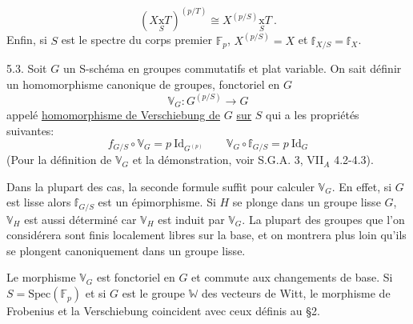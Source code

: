 \[ (X \underset{S}{\text{x}} T)^{(p/T)} \cong X^{(p/S)} \underset{S}{\text{x}} T \ . \]
Enfin, si $S$ est le spectre du corps premier $\mathbb{F}_p$, $X^{(p/S)} = X$ et
$\mathbb{f}_{X/S} = \mathbb{f}_X$.

5.3. Soit $G$ un S-schéma en groupes commutatifs et plat variable.
On sait définir un homomorphisme canonique de groupes, fonctoriel en $G$
\[ \mathbb{V}_G \colon G^{(p/S)} \to G \]
appelé \uline{homomorphisme de Verschiebung de} $G$ \uline{sur} $S$ qui a les propriétés
suivantes:
\[ \boxed{ f_{G/S} \circ \mathbb{V}_G = p \ \mathrm{Id}_{G^{(p)}} \qquad \mathbb{V}_G \circ \mathbb{f}_{G/S} = p \ \mathrm{Id}_G } \]
(Pour la définition de $\mathbb{V}_G$ et la démonstration, voir S.G.A. 3, VII$_A$
4.2-4.3).

Dans la plupart des cas, la seconde formule suffit pour calculer
$\mathbb{V}_G$. En effet, si $G$ est lisse alors $\mathbb{f}_{G/S}$ est un épimorphisme. Si $H$
se plonge dans un groupe lisse $G$, $\mathbb{V}_H$ est aussi déterminé car $\mathbb{V}_H$ est
induit par $\mathbb{V}_G$. La plupart des groupes que l'on considérera sont finis
localement libres sur la base, et on montrera plus loin qu'ils se plongent
canoniquement dans un groupe lisse.

Le morphisme $\mathbb{V}_G$ est fonctoriel en $G$ et commute aux changements
de base. Si $S = \mathrm{Spec}(\mathbb{F}_p)$ et si $G$ est le groupe $\mathbb{W}$ des vecteurs de
Witt, le morphisme de Frobenius et la Verschiebung coincident avec ceux
définis au §2.

